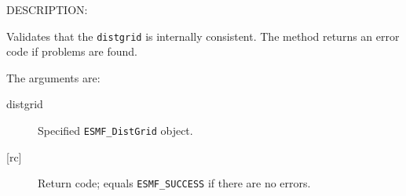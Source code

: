 {\sf DESCRIPTION:\\ }


        Validates that the {\tt distgrid} is internally consistent.
        The method returns an error code if problems are found.  
  
       The arguments are:
       \begin{description}
       \item[distgrid] 
            Specified {\tt ESMF\_DistGrid} object.
       \item[{[rc]}] 
            Return code; equals {\tt ESMF\_SUCCESS} if there are no errors.
       \end{description}
  
\setlength{\parskip}{\oldparskip}
\setlength{\parindent}{\oldparindent}
\setlength{\baselineskip}{\oldbaselineskip}
